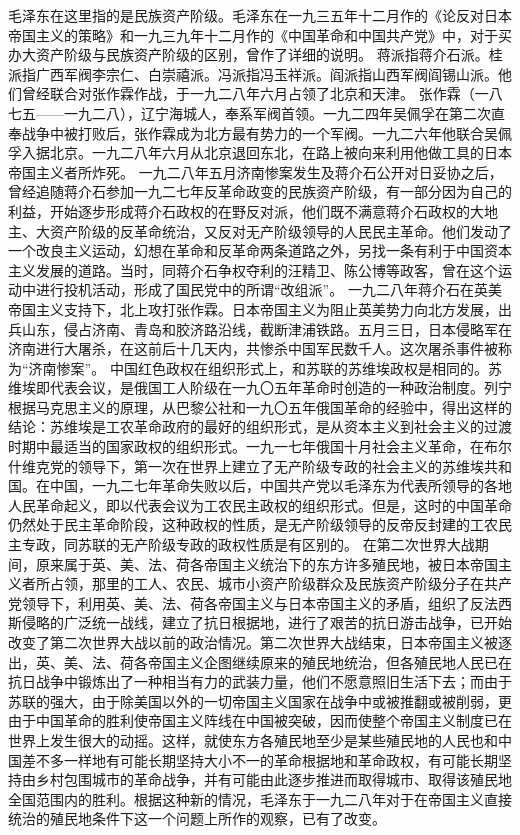 \begin{maonote}
毛泽东在这里指的是民族资产阶级。毛泽东在一九三五年十二月作的《论反对日本帝国主义的策略》和一九三九年十二月作的《中国革命和中国共产党》中，对于买办大资产阶级与民族资产阶级的区别，曾作了详细的说明。
蒋派指蒋介石派。桂派指广西军阀李宗仁、白崇禧派。冯派指冯玉祥派。阎派指山西军阀阎锡山派。他们曾经联合对张作霖作战，于一九二八年六月占领了北京和天津。
张作霖（一八七五——一九二八），辽宁海城人，奉系军阀首领。一九二四年吴佩孚在第二次直奉战争中被打败后，张作霖成为北方最有势力的一个军阀。一九二六年他联合吴佩孚入据北京。一九二八年六月从北京退回东北，在路上被向来利用他做工具的日本帝国主义者所炸死。
一九二八年五月济南惨案发生及蒋介石公开对日妥协之后，曾经追随蒋介石参加一九二七年反革命政变的民族资产阶级，有一部分因为自己的利益，开始逐步形成蒋介石政权的在野反对派，他们既不满意蒋介石政权的大地主、大资产阶级的反革命统治，又反对无产阶级领导的人民民主革命。他们发动了一个改良主义运动，幻想在革命和反革命两条道路之外，另找一条有利于中国资本主义发展的道路。当时，同蒋介石争权夺利的汪精卫、陈公博等政客，曾在这个运动中进行投机活动，形成了国民党中的所谓“改组派”。
一九二八年蒋介石在英美帝国主义支持下，北上攻打张作霖。日本帝国主义为阻止英美势力向北方发展，出兵山东，侵占济南、青岛和胶济路沿线，截断津浦铁路。五月三日，日本侵略军在济南进行大屠杀，在这前后十几天内，共惨杀中国军民数千人。这次屠杀事件被称为“济南惨案”。
中国红色政权在组织形式上，和苏联的苏维埃政权是相同的。苏维埃即代表会议，是俄国工人阶级在一九〇五年革命时创造的一种政治制度。列宁根据马克思主义的原理，从巴黎公社和一九〇五年俄国革命的经验中，得出这样的结论：苏维埃是工农革命政府的最好的组织形式，是从资本主义到社会主义的过渡时期中最适当的国家政权的组织形式。一九一七年俄国十月社会主义革命，在布尔什维克党的领导下，第一次在世界上建立了无产阶级专政的社会主义的苏维埃共和国。在中国，一九二七年革命失败以后，中国共产党以毛泽东为代表所领导的各地人民革命起义，即以代表会议为工农民主政权的组织形式。但是，这时的中国革命仍然处于民主革命阶段，这种政权的性质，是无产阶级领导的反帝反封建的工农民主专政，同苏联的无产阶级专政的政权性质是有区别的。
在第二次世界大战期间，原来属于英、美、法、荷各帝国主义统治下的东方许多殖民地，被日本帝国主义者所占领，那里的工人、农民、城市小资产阶级群众及民族资产阶级分子在共产党领导下，利用英、美、法、荷各帝国主义与日本帝国主义的矛盾，组织了反法西斯侵略的广泛统一战线，建立了抗日根据地，进行了艰苦的抗日游击战争，已开始改变了第二次世界大战以前的政治情况。第二次世界大战结束，日本帝国主义被逐出，英、美、法、荷各帝国主义企图继续原来的殖民地统治，但各殖民地人民已在抗日战争中锻炼出了一种相当有力的武装力量，他们不愿意照旧生活下去；而由于苏联的强大，由于除美国以外的一切帝国主义国家在战争中或被推翻或被削弱，更由于中国革命的胜利使帝国主义阵线在中国被突破，因而使整个帝国主义制度已在世界上发生很大的动摇。这样，就使东方各殖民地至少是某些殖民地的人民也和中国差不多一样地有可能长期坚持大小不一的革命根据地和革命政权，有可能长期坚持由乡村包围城市的革命战争，并有可能由此逐步推进而取得城市、取得该殖民地全国范围内的胜利。根据这种新的情况，毛泽东于一九二八年对于在帝国主义直接统治的殖民地条件下这一个问题上所作的观察，已有了改变。

\end{maonote}
